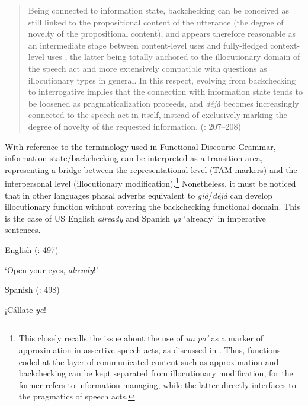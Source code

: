 \begin{quote}
Being connected to information state, backchecking can be conceived as still linked to the propositional content of the utterance (the degree of novelty of the propositional content), and appears therefore reasonable as an intermediate stage between content-level uses and fully-fledged context-level uses \citep{Hansen2008}, the latter being totally anchored to the illocutionary domain of the speech act and more extensively compatible with questions as illocutionary types in general. In this respect, evolving from backchecking to interrogative implies that the connection with information state tends to be loosened as pragmaticalization proceeds, and \textit{déjà} becomes increasingly connected to the speech act in itself, instead of exclusively marking the degree of novelty of the requested information. (\citealt{Squartini2014}: 207–208)
\end{quote}

With reference to the terminology used in Functional Discourse Grammar, information state/backchecking can be interpreted as a transition area, representing a bridge between the representational level (TAM markers) and the interpersonal level (illocutionary modification).\footnote{This closely recalls the issue about the use of \textit{un po’} as a marker of approximation in assertive speech acts, as discussed in . Thus, functions coded at the layer of communicated content such as approximation and backchecking can be kept separated from illocutionary modification, for the former refers to information managing, while the latter directly interfaces to the pragmatics of speech acts.}  Nonetheless, it must be noticed that in other languages phasal adverbs equivalent to \textit{già}/\textit{déjà} can develop illocutionary function without covering the backchecking functional domain. This is the case of US English \textit{already}  and Spanish \textit{ya} ‘already’  in imperative sentences.

\ea%
    \label{ex:key:101}

          English (\citealt{HansenStrudsholm2008}: 497)

\glt ‘Open your eyes, \textit{already}!’
    \z %

\ea%
    \label{ex:key:102}

          Spanish (\citealt{HansenStrudsholm2008}: 498)

  ¡Cállate \textit{ya}!

